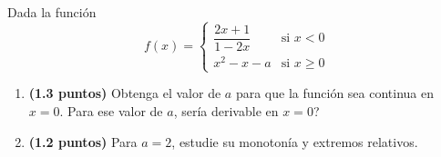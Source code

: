 
Dada la función
\[
f(x)=\begin{cases}
\dfrac{2x+1}{1-2x} & \text{si }x<0\\[4pt]
x^2-x-a & \text{si }x\geq0
\end{cases}
\]
\begin{enumerate}[label=\alph*)]
\item \textbf{(1.3 puntos)} Obtenga el valor de $a$ para que la función sea continua en $x=0$. Para ese valor de $a$, \textquestiondown{}sería derivable en $x=0$?
\item \textbf{(1.2 puntos)} Para $a=2$, estudie su monotonía y extremos relativos.
\end{enumerate}
